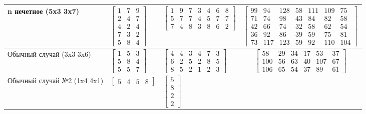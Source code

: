 \documentclass[12pt]{report}
\begin{document}
\begin{table}[H]
\begin{center}
\begin{tabular}{|p{2cm}|p{3.4cm}|p{3.9cm}|c|}
				\hline
				n нечетное (5x3 3x7) & 
				$\begin{bmatrix}
				1 & 7 & 9\\
				2 & 4 & 7\\
				4 & 2 & 4\\
				7 & 3 & 2\\
				5 & 8 & 4
				\end{bmatrix}$ & 
				$\begin{bmatrix}
				1 & 9 & 7 & 3 & 4 & 6 & 8\\
				5 & 7 & 7 & 4 & 5 & 7 & 7\\
				7 & 4 & 8 & 3 & 8 & 6 & 2
				\end{bmatrix}$ & 
				$\begin{bmatrix}
				99 & 94 & 128 & 58 & 111 & 109 & 75 \\
				71 & 74 & 98 & 43 & 84 & 82 & 58 \\
				42 & 66 & 74 & 32 & 58 & 62 & 54 \\
				36 & 92 & 86 & 39 & 59 & 75 & 81 \\
				73 & 117 & 123 & 59 & 92 & 110 & 104
				\end{bmatrix}$ \\
				\hline
				Обычный случай (3x3 3x6) & 
				$\begin{bmatrix}
				1 & 5 & 3\\
				5 & 8 & 4\\
				5 & 5 & 7
				\end{bmatrix}$ & 
				$\begin{bmatrix}
				4 & 4 & 3 & 4 & 7 & 3\\
				6 & 2 & 5 & 2 & 8 & 5\\
				8 & 5 & 2 & 1 & 2 & 3
				\end{bmatrix}$
				 & 
				 $\begin{bmatrix}
				 58 & 29 & 34 & 17 & 53 & 37\\
				 100 & 56 & 63 & 40 & 107 & 67\\
				 106 & 65 &54 & 37 & 89 & 61
				 \end{bmatrix}$ \\
				\hline
				Обычный случай №2 (1x4 4x1) & 
				$\begin{bmatrix}
				5 & 4 & 5 & 8
				\end{bmatrix}$ & 
				$\begin{bmatrix}
				5\\
				8\\
				2\\
				2
				\end{bmatrix}$ & 

\end{tabular}
\end{center}
\end{table}
\end{document}

